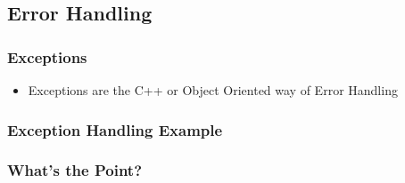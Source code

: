 \subsection{Error Handling}\label{error-handling}

\subsubsection{Exceptions}\label{exceptions}

\begin{itemize}
\itemsep1pt\parskip0pt
\item
  Exceptions are the C++ or Object Oriented way of Error Handling
\end{itemize}

\subsubsection{Exception Handling
Example}\label{exception-handling-example}

\begin{Shaded}
\begin{Highlighting}[]
  \NormalTok{; \}}

 
\NormalTok{\{}
  \NormalTok{\{}
     \NormalTok{;}
     
    \NormalTok{\{}
       \NormalTok{);}
    \NormalTok{\}}
  \NormalTok{\}}
   
  \NormalTok{\{}
     
  \NormalTok{\}}
\NormalTok{\}}

\end{Highlighting}
\end{Shaded}

\subsubsection{What's the Point?}\label{whats-the-point}


